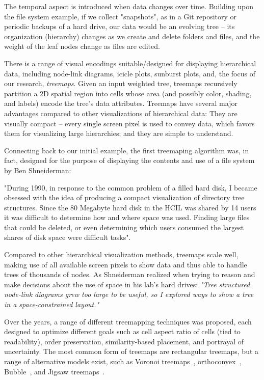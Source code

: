 The temporal aspect is introduced when data changes over time. Building upon the file system example, if we collect "snapshots", as in a Git repository or periodic backups of a hard drive, our data would be an evolving tree -- its organization (hierarchy) changes as we create and delete folders and files, and the weight of the leaf nodes change as files are edited.

There is a range of visual encodings suitable/designed for displaying hierarchical data, including node-link diagrams, icicle plots, sunburst plots, and, the focus of our research, \emph{treemaps}.
Given an input weighted tree, treemaps recursively partition a 2D spatial region into cells whose area (and possibly color, shading, and labels) encode the tree's data attributes. Treemaps have several major advantages compared to other visualizations of hierarchical data: They are visually compact -- every single screen pixel is used to convey data, which favors them for visualizing large hierarchies; and they are simple to understand.

Connecting back to our initial example, the first treemaping algorithm \citep{shneiderman92} was, in fact, designed for the purpose of displaying the contents and use of a file system by Ben Shneiderman:

\begin{quoting}
    "During 1990, in response to the common problem of a filled hard disk, I became obsessed with the idea of producing a compact visualization of directory tree structures. Since the 80 Megabyte hard disk in the HCIL was shared by 14 users it was difficult to determine how and where space was used. Finding large files that could be deleted, or even determining which users consumed the largest shares of disk space were difficult tasks".
\end{quoting}

Compared to other hierarchical visualization methods, treemaps scale well, making use of all available screen pixels to show data and thus able to handle trees of thousands of nodes. As Shneiderman realized when trying to reason and make decisions about the use of space in his lab's hard drives:
\textit{"Tree structured node-link diagrams grew too large to be useful, so I explored ways to show a tree in a space-constrained layout."}

Over the years, a range of different treemapping techniques was proposed, each designed to optimize different goals such as cell aspect ratio of cells (tied to readability), order preservation, similarity-based placement, and portrayal of uncertainty. The most common form of treemaps are rectangular treemaps, but a range of alternative models exist, such as Voronoi treemaps~\citep{balzer05,balzer05b}, orthoconvex~\citep{deberg14}, Bubble~\citep{bubble}, and Jigsaw treemaps~\citep{jigsaw}.

